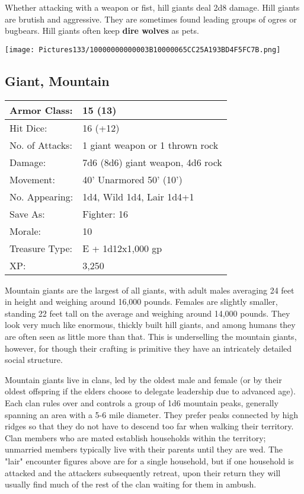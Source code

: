 \documentclass[a4paper,twoside,openany,10pt]{book}
\begin{document}
\begin{multicols}{2}
Whether attacking with a weapon or fist, hill giants deal 2d8 damage. Hill giants are brutish and aggressive. They are sometimes found leading groups of ogres or bugbears. Hill giants often keep \textbf{dire wolves} as pets.

\begin{center}
	\texttt{[image: Pictures133/10000000000003B10000065CC25A193BD4F5FC7B.png]}
\end{center}

\subsection*{Giant, Mountain}\label{giant-mountain}

\begin{tabularx}{0.48\textwidth}{@{}lX@{}}
Armor Class: & 15 (13) \\\hline
Hit Dice: & 16 (+12) \\\hline
No. of Attacks: & 1 giant weapon or 1 thrown rock \\\hline
Damage: & 7d6 (8d6) giant weapon, 4d6 rock \\\hline
Movement: & 40' Unarmored 50'
(10') \\\hline
No. Appearing: & 1d4, Wild 1d4, Lair 1d4+1 \\\hline
Save As: & Fighter: 16 \\\hline
Morale: & 10 \\\hline
Treasure Type: & E + 1d12x1,000 gp \\\hline
XP: & 3,250 \\\hline
\end{tabularx}\medskip

Mountain giants are the largest of all giants, with adult males averaging 24 feet in height and weighing around 16,000 pounds. Females are slightly smaller, standing 22 feet tall on the average and weighing around 14,000 pounds. They look very much like enormous, thickly built hill giants, and among humans they are often seen as little more than that. This is underselling the mountain giants, however, for though their crafting is primitive they have an intricately detailed social structure.

Mountain giants live in clans, led by the oldest male and female (or by their oldest offspring if the elders choose to delegate leadership due to advanced age). Each clan rules over and controls a group of 1d6 mountain peaks, generally spanning an area with a 5-6 mile diameter. They prefer peaks connected by high ridges so that they do not have to descend too far when walking their territory. Clan members who are mated establish households within the territory; unmarried members typically live with their parents until they are wed. The "lair" encounter figures above are for a single household, but if one household is attacked and the attackers subsequently retreat, upon their return they will usually find much of the rest of the clan waiting for them in ambush.


\end{multicols}
\end{document}
